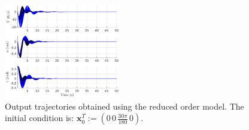\documentclass[letterpaper, 10 pt, conference]{ieeeconf}  %
\newcommand{\vo}[1]{\boldsymbol{#1}}
\begin{document}
\begin{figure}[!ht]
        \begin{centering}
   \includegraphics[width=0.45\textwidth]{figs/yTrajRed.eps}
\end{centering}
   \caption{Output trajectories obtained using the reduced order model. The initial condition is: $\vo{x}_0^T := (0\, 0\, \frac{30 \pi}{180}\, 0)$.}
   \label{yTrajRed}
\end{figure}
\end{document}
